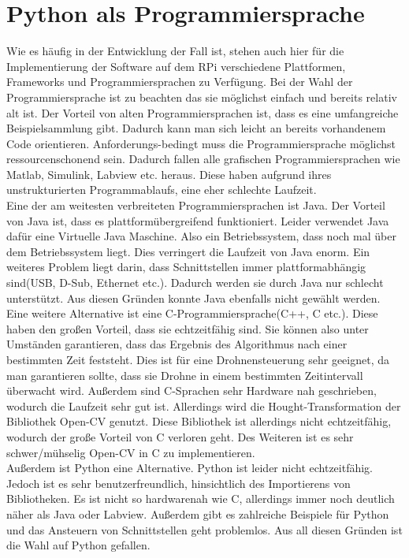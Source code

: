 \section{Python als Programmiersprache}
Wie es häufig in der Entwicklung der Fall ist, stehen auch hier für die Implementierung
der Software auf dem RPi verschiedene Plattformen, Frameworks und
Programmiersprachen zu Verfügung. Bei der Wahl der Programmiersprache ist zu beachten das sie möglichst einfach und bereits relativ alt ist. Der Vorteil von alten Programmiersprachen ist, dass es eine umfangreiche Beispielsammlung gibt. Dadurch kann man sich leicht an bereits vorhandenem Code orientieren.
Anforderungs-bedingt muss die Programmiersprache möglichst ressourcenschonend sein.
Dadurch fallen alle grafischen Programmiersprachen wie Matlab, Simulink, Labview etc. heraus. Diese haben aufgrund ihres unstrukturierten Programmablaufs, eine eher schlechte Laufzeit.\\ 

Eine der am weitesten verbreiteten Programmiersprachen ist Java. Der Vorteil von Java ist, dass es plattformübergreifend funktioniert. Leider verwendet Java dafür eine Virtuelle Java Maschine. Also ein Betriebssystem, dass noch mal über dem Betriebssystem liegt. Dies verringert die Laufzeit von Java enorm. Ein weiteres Problem liegt darin, dass Schnittstellen immer plattformabhängig sind(USB, D-Sub, Ethernet etc.). Dadurch werden sie durch Java nur schlecht unterstützt. Aus diesen Gründen konnte Java ebenfalls nicht gewählt werden.\\

Eine weitere Alternative ist eine C-Programmiersprache(C++, C etc.). Diese haben den großen Vorteil, dass sie echtzeitfähig sind. Sie können also unter Umständen garantieren, dass das Ergebnis des Algorithmus nach einer bestimmten Zeit feststeht. Dies ist für eine Drohnensteuerung sehr geeignet, da man garantieren sollte, dass sie Drohne in einem bestimmten Zeitintervall überwacht wird. Außerdem sind C-Sprachen sehr Hardware nah geschrieben, wodurch die Laufzeit sehr gut ist. Allerdings wird die Hought-Transformation der Bibliothek Open-CV genutzt. Diese Bibliothek ist allerdings nicht echtzeitfähig, wodurch der große Vorteil von C verloren geht. Des Weiteren ist es sehr schwer/mühselig Open-CV in C zu implementieren.\\

Außerdem ist Python eine Alternative. Python ist leider nicht echtzeitfähig. Jedoch ist es sehr benutzerfreundlich, hinsichtlich des Importierens von Bibliotheken. Es ist nicht so hardwarenah wie C, allerdings immer noch deutlich näher als Java oder Labview. Außerdem gibt es zahlreiche Beispiele für Python und das Ansteuern von Schnittstellen geht problemlos. Aus all diesen Gründen ist die Wahl auf Python gefallen.

